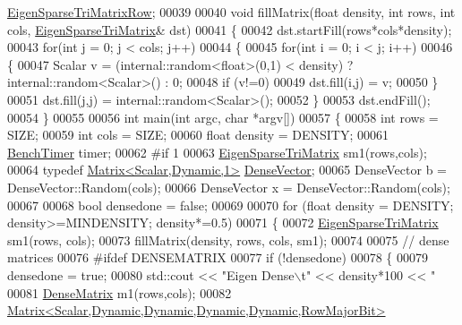 \begin{DoxyCode}
      \hyperlink{group___sparse_core___module_class_eigen_1_1_sparse_matrix}{EigenSparseTriMatrixRow};
00039 
00040 \textcolor{keywordtype}{void} fillMatrix(\textcolor{keywordtype}{float} density, \textcolor{keywordtype}{int} rows, \textcolor{keywordtype}{int} cols,  \hyperlink{group___sparse_core___module_class_eigen_1_1_sparse_matrix}{EigenSparseTriMatrix}& dst)
00041 \{
00042   dst.startFill(rows*cols*density);
00043   \textcolor{keywordflow}{for}(\textcolor{keywordtype}{int} j = 0; j < cols; j++)
00044   \{
00045     \textcolor{keywordflow}{for}(\textcolor{keywordtype}{int} i = 0; i < j; i++)
00046     \{
00047       Scalar v = (internal::random<float>(0,1) < density) ? internal::random<Scalar>() : 0;
00048       \textcolor{keywordflow}{if} (v!=0)
00049         dst.fill(i,j) = v;
00050     \}
00051     dst.fill(j,j) = internal::random<Scalar>();
00052   \}
00053   dst.endFill();
00054 \}
00055 
00056 \textcolor{keywordtype}{int} main(\textcolor{keywordtype}{int} argc, \textcolor{keywordtype}{char} *argv[])
00057 \{
00058   \textcolor{keywordtype}{int} rows = SIZE;
00059   \textcolor{keywordtype}{int} cols = SIZE;
00060   \textcolor{keywordtype}{float} density = DENSITY;
00061   \hyperlink{class_eigen_1_1_bench_timer}{BenchTimer} timer;
00062 \textcolor{preprocessor}{  #if 1}
00063   \hyperlink{group___sparse_core___module_class_eigen_1_1_sparse_matrix}{EigenSparseTriMatrix} sm1(rows,cols);
00064   \textcolor{keyword}{typedef} \hyperlink{group___core___module}{Matrix<Scalar,Dynamic,1>} \hyperlink{group___core___module}{DenseVector};
00065   DenseVector b = DenseVector::Random(cols);
00066   DenseVector x = DenseVector::Random(cols);
00067 
00068   \textcolor{keywordtype}{bool} densedone = \textcolor{keyword}{false};
00069 
00070   \textcolor{keywordflow}{for} (\textcolor{keywordtype}{float} density = DENSITY; density>=MINDENSITY; density*=0.5)
00071   \{
00072     \hyperlink{group___sparse_core___module_class_eigen_1_1_sparse_matrix}{EigenSparseTriMatrix} sm1(rows, cols);
00073     fillMatrix(density, rows, cols, sm1);
00074 
00075     \textcolor{comment}{// dense matrices}
00076 \textcolor{preprocessor}{    #ifdef DENSEMATRIX}
00077     \textcolor{keywordflow}{if} (!densedone)
00078     \{
00079       densedone = \textcolor{keyword}{true};
00080       std::cout << \textcolor{stringliteral}{"Eigen Dense\(\backslash\)t"} << density*100 << \textcolor{stringliteral}{"%
00081       \hyperlink{group___core___module}{DenseMatrix} m1(rows,cols);
00082       \hyperlink{group___core___module_class_eigen_1_1_matrix}{Matrix<Scalar,Dynamic,Dynamic,Dynamic,Dynamic,RowMajorBit>}
}
\end{DoxyCode}
